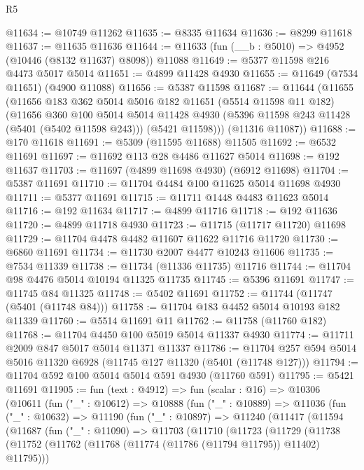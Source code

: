 \begin{lexlean}{R5}
\begin{coremodule}
@11634 := @10749 @11262
@11635 := @8335 @11634
@11636 := @8299 @11618
@11637 := @11635 @11636
@11644 := @11633 (fun (__b : @5010) => @4952 (@10446 (@8132 @11637) @8098)) @11088
@11649 := @5377 @11598 @216 @4473 @5017 @5014
@11651 := @4899 @11428 @4930
@11655 := @11649 (@7534 @11651) (@4900 @11088)
@11656 := @5387 @11598
@11687 := @11644
    (@11655
      (@11656
        @183
        @362
        @5014
        @5016
        @182
        @11651
        (@5514 @11598 @11 @182)
        (@11656
          @360
          @100
          @5014
          @5014
          @11428
          @4930
          (@5396 @11598 @243 @11428 (@5401 (@5402 @11598 @243)))
          (@5421 @11598)))
      (@11316 @11087))
@11688 := @170 @11618
@11691 := @5309 (@11595 @11688) @11505
@11692 := @6532 @11691
@11697 := @11692 @113 @28 @4486 @11627 @5014
@11698 := @192 @11637
@11703 := @11697 (@4899 @11698 @4930) (@6912 @11698)
@11704 := @5387 @11691
@11710 := @11704 @4484 @100 @11625 @5014 @11698 @4930
@11711 := @5377 @11691
@11715 := @11711 @1448 @4483 @11623 @5014
@11716 := @192 @11634
@11717 := @4899 @11716
@11718 := @192 @11636
@11720 := @4899 @11718 @4930
@11723 := @11715 (@11717 @11720) @11698
@11729 := @11704 @4478 @4482 @11607 @11622 @11716 @11720
@11730 := @6860 @11691
@11734 := @11730 @2007 @4477 @10243 @11606
@11735 := @7534 @11339
@11738 := @11734 (@11336 @11735) @11716
@11744 := @11704 @98 @4476 @5014 @10194 @11325 @11735
@11745 := @5396 @11691
@11747 := @11745 @84 @11325
@11748 := @5402 @11691
@11752 := @11744 (@11747 (@5401 (@11748 @84)))
@11758 := @11704 @183 @4452 @5014 @10193 @182 @11339
@11760 := @5514 @11691 @11
@11762 := @11758 (@11760 @182)
@11768 := @11704 @4450 @100 @5019 @5014 @11337 @4930
@11774 := @11711 @2009 @847 @5017 @5014 @11371 @11337
@11786 := @11704 @257 @594 @5014 @5016 @11320 @6928 (@11745 @127 @11320 (@5401 (@11748 @127)))
@11794 := @11704 @592 @100 @5014 @5014 @591 @4930 (@11760 @591)
@11795 := @5421 @11691
@11905 := fun (text : @4912) =>
  fun (scalar : @16) =>
  @10306
    (@10611
      (fun ("_" : @10612) =>
      @10888
        (fun ("_" : @10889) =>
        @11036
          (fun ("_" : @10632) =>
          @11190
            (fun ("_" : @10897) =>
            @11240
              (@11417
                (@11594
                  (@11687
                    (fun ("_" : @11090) =>
                    @11703
                      (@11710
                        (@11723
                          (@11729
                            (@11738
                              (@11752
                                (@11762 (@11768 (@11774 (@11786 (@11794 @11795)) @11402) @11795)))

\end{coremodule}
\end{lexlean}
